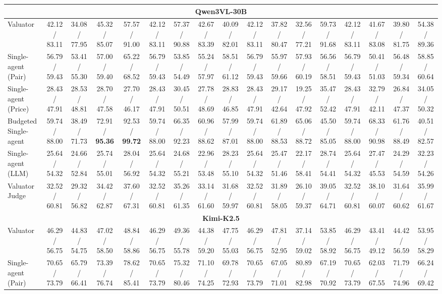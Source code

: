 \begin{table}[!t]
{\begin{tabular}{lcccccccccccccccc}
\midrule
\multicolumn{17}{c}{\textbf{Qwen3VL-30B}} \\
\midrule
Valuator                     & 42.12 / 83.11 & 34.08 / 77.95 & 45.32 / 85.07 & 57.57 / 91.00 & 42.12 / 83.11 & 57.37 / 90.88 & 42.67 / 83.39 & 40.09 / 82.01 & 42.12 / 83.11 & 37.82 / 80.47 & 32.56 / 77.21 & 59.73 / 91.68 & 42.12 / 83.11 & 41.67 / 83.08 & 39.80 / 81.75 & 54.38 / 89.36 \\
Single-agent (Pair)          & 56.79 / 59.43 & 53.41 / 55.30 & 57.00 / 59.40 & 65.22 / 68.52 & 56.79 / 59.43 & 53.85 / 54.49 & 55.24 / 57.97 & 58.51 / 61.12 & 56.79 / 59.43 & 55.97 / 59.66 & 57.93 / 60.19 & 56.56 / 58.51 & 56.79 / 59.43 & 50.41 / 51.03 & 56.48 / 59.34 & 58.85 / 60.64 \\
Single-agent (Price)         & 28.43 / 47.91 & 28.53 / 48.81 & 28.70 / 47.58 & 27.70 / 46.17 & 28.43 / 47.91 & 30.45 / 50.51 & 27.78 / 48.69 & 28.83 / 46.85 & 28.43 / 47.91 & 29.17 / 42.64 & 19.25 / 47.92 & 35.47 / 52.42 & 28.43 / 47.91 & 32.79 / 42.11 & 26.84 / 47.37 & 34.05 / 50.32 \\
Budgeted Single-agent        & 59.74 / 88.00 & 38.49 / 71.73 & 72.91 / \textbf{95.36} & 92.53 / \textbf{99.72} & 59.74 / 88.00 & 66.35 / 92.23 & 60.96 / 88.62 & 57.99 / 87.01 & 59.74 / 88.00 & 61.89 / 88.53 & 65.06 / 88.72 & 45.50 / 85.05 & 59.74 / 88.00 & 68.33 / 90.98 & 61.76 / 88.49 & 40.51 / 82.57 \\
Single-agent (LLM)           & 25.64 / 54.32 & 24.66 / 52.84 & 25.74 / 55.01 & 28.04 / 56.92 & 25.64 / 54.32 & 24.68 / 55.21 & 22.96 / 53.48 & 28.23 / 55.10 & 25.64 / 54.32 & 25.47 / 51.46 & 22.17 / 58.41 & 28.74 / 54.41 & 25.64 / 54.32 & 27.47 / 45.53 & 24.29 / 54.59 & 32.23 / 54.26 \\
Valuator Judge               & 32.52 / 60.81 & 29.32 / 56.82 & 34.42 / 62.87 & 37.60 / 67.31 & 32.52 / 60.81 & 35.26 / 61.35 & 33.14 / 61.60 & 31.68 / 59.97 & 32.52 / 60.81 & 31.89 / 58.05 & 26.10 / 59.37 & 39.05 / 64.71 & 32.52 / 60.81 & 38.10 / 60.07 & 31.64 / 60.62 & 35.99 / 61.67 \\
\midrule
\multicolumn{17}{c}{\textbf{Kimi-K2.5}} \\
\midrule
Valuator                     & 46.29 / 56.75 & 44.83 / 54.75 & 47.02 / 58.50 & 48.84 / 58.86 & 46.29 / 56.75 & 49.36 / 55.78 & 44.38 / 59.20 & 47.75 / 55.03 & 46.29 / 56.75 & 47.81 / 52.95 & 37.14 / 59.02 & 53.85 / 58.92 & 46.29 / 56.75 & 43.41 / 49.12 & 44.42 / 56.59 & 53.95 / 58.29 \\
Single-agent (Pair)          & 70.65 / 73.79 & 65.79 / 66.41 & 73.39 / 76.74 & 78.62 / 85.41 & 70.65 / 73.79 & 75.32 / 80.46 & 71.10 / 74.25 & 69.78 / 72.93 & 70.65 / 73.79 & 67.05 / 71.01 & 80.89 / 82.98 & 67.19 / 70.92 & 70.65 / 73.79 & 62.03 / 67.55 & 71.79 / 74.96 & 66.24 / 69.42 \\

\end{tabular}}
\end{table}
